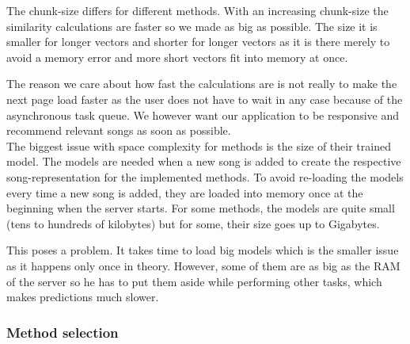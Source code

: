 The chunk-size differs for different methods. With an increasing chunk-size the similarity calculations are faster so we made as big as possible. The size it is smaller for longer vectors and shorter for longer vectors as it is there merely to avoid a memory error and more short vectors fit into memory at once. 

The reason we care about how fast the calculations are is not really to make the next page load faster as the user does not have to wait in any case because of the asynchronous task queue. We however want our application to be responsive and recommend relevant songs as soon as possible. \\

The biggest issue with space complexity for methods is the size of their trained model. The models are needed when a new song is added to create the respective song-representation for the implemented methods. To avoid re-loading the models every time a new song is added, they are loaded into memory once at the beginning when the server starts. For some methods, the models are quite small (tens to hundreds of kilobytes) but for some, their size goes up to Gigabytes.

This poses a problem. It takes time to load big models which is the smaller issue as it happens only once in theory. However, some of them are as big as the RAM of the server so he has to put them aside while performing other tasks, which makes predictions much slower.

\subsubsection{Method selection}\label{ssec:method_selection}

